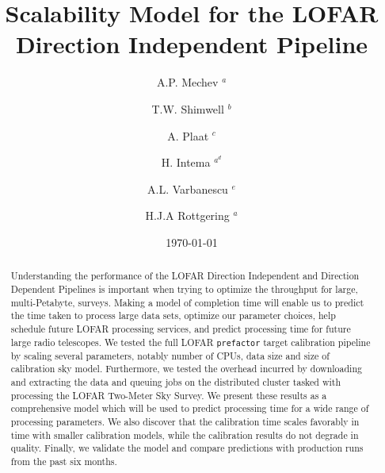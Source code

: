 \documentclass[preprint,5p]{elsarticle}
\begin{document}
\sloppy
{}
\begin{frontmatter}


\title{Scalability Model for the LOFAR Direction Independent Pipeline}%
\author{A.P. Mechev $^a$}

\author{T.W. Shimwell $^b$}%
\author{A. Plaat $^c$}%
\author{H. Intema $^a^d$}%
\author{A.L. Varbanescu $^e$}
\author{H.J.A Rottgering $^a$}%

\date{\today}%
\address{$^a$ Leiden Observatory, Niels Bohrweg 2, 2333 CA Leiden, the Netherlands}
\address{$^b$ ASTRON, Oude Hoogeveensedijk 4, 7991 PD , The Netherlands }
\address{$^c$ Leiden Institute of Advanced Computer Science, Niels Bohrweg 1, 2333 CA Leiden, the Netherlands}
\address{$^d$ International Centre for Radio Astronomy Research -- Curtin University, GPO Box U1987, Perth, WA 6845, Australia}
\address{$^e$ University of Amsterdam, Spui 21, 1012 WX Amsterdam, the Netherlands}


\begin{abstract}
Understanding the performance of the LOFAR Direction Independent and Direction Dependent Pipelines is important when trying to optimize the throughput for large, multi-Petabyte,  surveys. Making a model of completion time will enable us to predict the time taken to process large data sets, optimize our parameter choices, help schedule future LOFAR processing services, and predict processing time for future large radio telescopes. We tested the full LOFAR \texttt{prefactor} target calibration pipeline by scaling several parameters, notably number of CPUs, data size and size of calibration sky model. Furthermore, we tested the overhead incurred by downloading and extracting the data and queuing jobs on the distributed cluster tasked with processing the LOFAR Two-Meter Sky Survey. We present these results as a comprehensive model which will be used to predict processing time for a wide range of processing parameters. We also discover that the calibration time scales favorably in time with smaller calibration models, while the calibration results do not degrade in quality. Finally, we validate the model and compare predictions with production runs from the past six months. 


\end{abstract}
\end{frontmatter}
\end{document}
